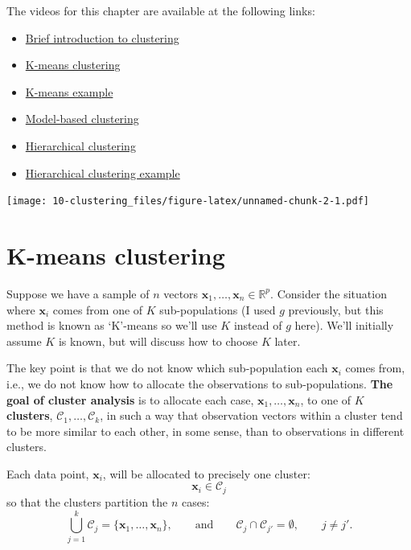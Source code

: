 \documentclass[
]{book}
\providecommand{\tightlist}{%
  \setlength{\itemsep}{0pt}\setlength{\parskip}{0pt}}
\theoremstyle{definition}
\theoremstyle{definition}
\theoremstyle{definition}
\theoremstyle{definition}
\theoremstyle{remark}
\begin{document}
The videos for this chapter are available at the following links:

\begin{itemize}
\tightlist
\item
  \href{https://mediaspace.nottingham.ac.uk/media/ClusteringA+Introduction/1_771r59k0}{Brief introduction to clustering}
\item
  \href{https://mediaspace.nottingham.ac.uk/media/ClusteringA+K-means+clustering/1_vqjrjyey}{K-means clustering}
\item
  \href{https://mediaspace.nottingham.ac.uk/media/ClusteringA+K-means+example/1_6fhpxnii}{K-means example}
\item
  \href{https://mediaspace.nottingham.ac.uk/media/ClusteringA+Model-based+clustering/1_89rjovbp}{Model-based clustering}
\item
  \href{https://mediaspace.nottingham.ac.uk/media/ClusteringA+Hierarchical+methods/1_ngog5anc}{Hierarchical clustering}
\item
  \href{https://mediaspace.nottingham.ac.uk/media/ClusteringA+Hierarchical+example/1_kuzx1iy6}{Hierarchical clustering example}
\end{itemize}

\texttt{[image: 10-clustering\_files/figure-latex/unnamed-chunk-2-1.pdf]}

\section{K-means clustering}\label{k-means-clustering}

Suppose we have a sample of \(n\) vectors \(\mathbf x_1, \ldots , \mathbf x_n \in \mathbb{R}^p\). Consider the situation where \(\mathbf x_i\) comes from one of \(K\) sub-populations (I used \(g\) previously, but this method is known as `K'-means so we'll use \(K\) instead of \(g\) here). We'll initially assume \(K\) is known, but will discuss how to choose \(K\) later.

The key point is that we do not know which sub-population each \(\mathbf x_i\) comes from, i.e., we do not know how to allocate the observations to sub-populations. \textbf{The goal of cluster analysis} is to allocate each case, \(\mathbf x_1, \ldots, \mathbf x_n\), to one of \(K\) \textbf{clusters}, \(\mathcal{C}_1, \ldots , \mathcal{C}_k\), in such a way that observation vectors within a cluster tend to be more similar to each other, in some sense, than to observations in different clusters.

Each data point, \(\mathbf x_i\), will be allocated to precisely one cluster:
\[\mathbf x_i \in \mathcal{C}_j\]
so that the clusters partition the \(n\) cases:
\[
\bigcup_{j=1}^k \mathcal{C}_j = \{\mathbf x_1, \ldots , \mathbf x_n\}, \qquad \text{and} \qquad \mathcal{C}_j \cap \mathcal{C}_{j'} =\emptyset,\qquad j \neq j'.
\]
\end{document}
